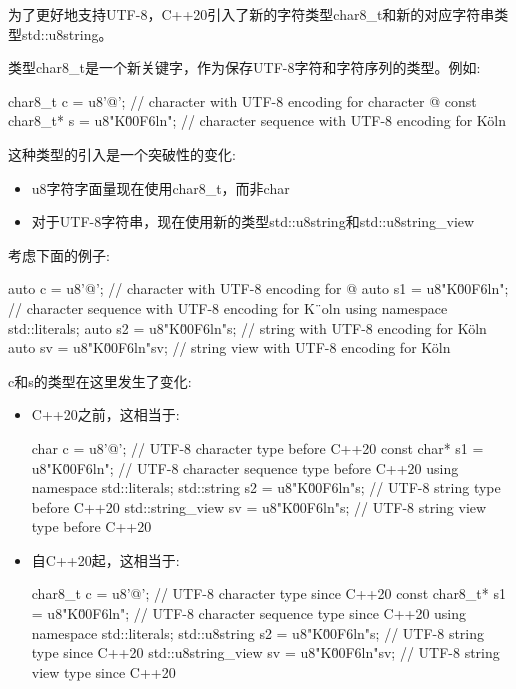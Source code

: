 
为了更好地支持UTF-8，C++20引入了新的字符类型char8\_t和新的对应字符串类型std::u8string。

类型char8\_t是一个新关键字，作为保存UTF-8字符和字符序列的类型。例如:

\begin{cpp}
char8_t c = u8'@'; // character with UTF-8 encoding for character @
const char8_t* s = u8"K\u00F6ln"; // character sequence with UTF-8 encoding for Köln
\end{cpp}

这种类型的引入是一个突破性的变化:

\begin{itemize}
\item 
u8字符字面量现在使用char8\_t，而非char

\item 
对于UTF-8字符串，现在使用新的类型std::u8string和std::u8string\_view
\end{itemize}

考虑下面的例子:

\begin{cpp}
auto c = u8'@'; // character with UTF-8 encoding for @
auto s1 = u8"K\u00F6ln"; // character sequence with UTF-8 encoding for K¨oln
using namespace std::literals;
auto s2 = u8"K\u00F6ln"s; // string with UTF-8 encoding for Köln
auto sv = u8"K\u00F6ln"sv; // string view with UTF-8 encoding for Köln
\end{cpp}

c和s的类型在这里发生了变化:

\begin{itemize}
\item 
C++20之前，这相当于:

\begin{cpp}
char c = u8'@'; // UTF-8 character type before C++20
const char* s1 = u8"K\u00F6ln"; // UTF-8 character sequence type before C++20
using namespace std::literals;
std::string s2 = u8"K\u00F6ln"s; // UTF-8 string type before C++20
std::string_view sv = u8"K\u00F6ln"s; // UTF-8 string view type before C++20
\end{cpp}

\item 
自C++20起，这相当于:

\begin{cpp}
char8_t c = u8'@'; // UTF-8 character type since C++20
const char8_t* s1 = u8"K\u00F6ln"; // UTF-8 character sequence type since C++20
using namespace std::literals;
std::u8string s2 = u8"K\u00F6ln"s; // UTF-8 string type since C++20
std::u8string_view sv = u8"K\u00F6ln"sv; // UTF-8 string view type since C++20
\end{cpp}

\end{itemize}

